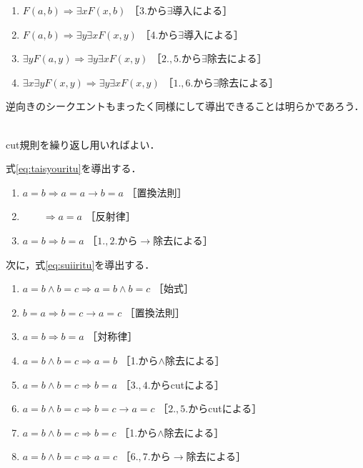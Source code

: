 \begin{description}
\begin{enumerate}[1. ]
    \item $F(a,b) \Longrightarrow \exists x F(x,b)$ \quad ［3.から$\exists$導入による］
    \item $F(a,b) \Longrightarrow \exists y \exists x F(x,y)$
           \quad ［4.から$\exists$導入による］
    \item $\exists y F(a,y) \Longrightarrow \exists y \exists x F(x,y)$
           \quad ［$2., 5.$から$\exists$除去による］
         \item $\exists x \exists y F(x,y) \Longrightarrow \exists y \exists x F(x,y)$
           \quad ［$1., 6.$から$\exists$除去による］
  \end{enumerate}
  逆向きのシークエントもまったく同様にして導出できることは明らかであろう．
\item[\refque{que:circdouti}] \mbox{} \\
  cut規則を繰り返し用いればよい．
\item[\refque{que:taisyousuii}] \mbox \\
  式\eqref{eq:taisyouritu}を導出する．
  \begin{enumerate}[1. ]
    \item $a =b \Longrightarrow a =a \to b =a$ \quad ［置換法則］
    \item $\qquad \Longrightarrow a =a$ \quad ［反射律］
    \item $a = b \Longrightarrow b =a$ \quad ［$1., 2.$から$\to$除去による］
  \end{enumerate}
  次に，式\eqref{eq:suiiritu}を導出する．
  \begin{enumerate}[1. ]
    \item $a =b \land b=c \Longrightarrow a = b \land b =c$ \quad ［始式］
    \item $b=a \Longrightarrow b=c \to a=c$ \quad ［置換法則］
    \item $a = b \Longrightarrow b =a$ \quad ［対称律］
    \item $a=b \land b=c \Longrightarrow a=b$ \quad ［1.から$\land$除去による］
    \item $a=b \land b=c \Longrightarrow b=a$ \quad ［$3., 4.$からcutによる］
    \item $a=b \land b=c \Longrightarrow b=c \to a=c$ \quad ［$2., 5.$からcutによる］
    \item $a =b \land b=c \Longrightarrow b=c$ \quad ［1.から$\land$除去による］
    \item $a=b \land b=c \Longrightarrow a=c$ \quad ［$6., 7.$から$\to$除去による］
  \end{enumerate}

\end{description}
